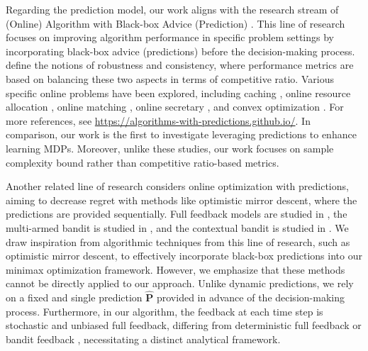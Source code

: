 \documentclass[12pt]{article}
\begin{document}
Regarding the prediction model, our work aligns with the research stream of (Online) Algorithm with Black-box Advice (Prediction) \cite{mitzenmacher2022algorithms,purohit2018improving}. 
This line of research focuses on improving algorithm performance in specific problem settings by incorporating black-box advice (predictions) before the decision-making process.
\cite{mitzenmacher2022algorithms,purohit2018improving} define the notions of robustness and consistency, where performance metrics are based on balancing these two aspects in terms of competitive ratio.
Various specific online problems have been explored, including caching \cite{lykouris2021competitive,rohatgi2020near}, online resource allocation \cite{jiang2020online, balseiro2022single,golrezaei2023online}, online matching \cite{jin2022online}, online secretary \cite{antoniadis2020secretary,dutting2021secretaries}, and convex optimization \cite{christianson2022chasing}. For more references, see \url{https://algorithms-with-predictions.github.io/}. In comparison, our work is the first to investigate leveraging predictions to enhance learning MDPs. Moreover, unlike these studies, our work focuses on sample complexity bound rather than competitive ratio-based metrics.

Another related line of research considers online optimization with predictions, aiming to decrease regret with methods like optimistic mirror descent, where the predictions are provided sequentially. Full feedback models are studied in \cite{rakhlin2013online,rakhlin2013optimization,jadbabaie2015online}, the multi-armed bandit is studied in \cite{wei2018more}, and the contextual bandit is studied in \cite{wei2020taking}.
We draw inspiration from algorithmic techniques from this line of research, such as optimistic mirror descent, to effectively incorporate black-box predictions into our minimax optimization framework. However, we emphasize that these methods cannot be directly applied to our approach. Unlike dynamic predictions, we rely on a fixed and single prediction $\hat{\boldsymbol{\text{P}}}$ provided in advance of the decision-making process. Furthermore, in our algorithm, the feedback at each time step is stochastic and unbiased full feedback, differing from deterministic full feedback \cite{rakhlin2013online,rakhlin2013optimization,jadbabaie2015online} or bandit feedback \cite{wei2018more,wei2020taking}, necessitating a distinct analytical framework.



\end{document}
